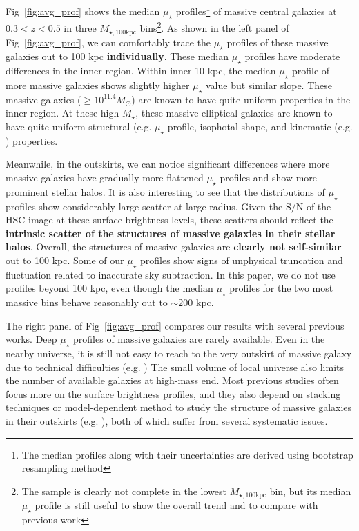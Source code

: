 \documentclass[a4paper,fleqn,usenatbib]{mnras}
\def\mstar{{$M_{\star}$}}
\def\mtot{{$M_{\star,100\mathrm{kpc}}$}}
\def\s2n{{$\mathrm{S}/\mathrm{N}$}}
\def\mden{{$\mu_{\star}$}}
\begin{document}
    Fig~\ref{fig:avg_prof} shows the median \mden{} profiles\footnote{The median 
    profiles along with their uncertainties are derived using bootstrap resampling 
    method} of massive central galaxies at $0.3 < z < 0.5$ in three \mtot{} 
    bins\footnote{The sample is clearly not complete in the lowest \mtot{} bin, 
    but its median \mden{} profile is still useful to show the overall trend and to 
    compare with previous work}. 
    As shown in the left panel of Fig~\ref{fig:avg_prof}, we can comfortably trace
    the \mden{} profiles of these massive galaxies out to 100 kpc 
    \textbf{individually}. 
    These median \mden{} profiles have moderate differences in the inner region. 
    Within inner 10 kpc, the median \mden{} profile of more massive galaxies 
    shows slightly higher \mden{} value but similar slope. 
    These massive galaxies ($\ge 10^{11.4} M_{\odot}$) are known to have quite 
    uniform properties in the inner region. 
    At these high \mstar{}, these massive elliptical galaxies are known to have 
    quite uniform structural (e.g. \mden{} profile, isophotal shape, 
    \citealt{Lauer07, Kormendy2009, Schombert2015} and kinematic (e.g. 
    \citealt{Cappellari13b}) properties. 
    
    Meanwhile, in the outskirts, we can notice significant differences where more 
    massive galaxies have gradually more flattened \mden{} profiles and show more 
    prominent stellar halos.
    It is also interesting to see that the distributions of \mden{} profiles show 
    considerably large scatter at large radius. 
    Given the \s2n{} of the HSC image at these surface brightness levels, these 
    scatters should reflect the \textbf{intrinsic scatter of the structures of 
    massive galaxies in their stellar halos}.
    Overall, the structures of massive galaxies are \textbf{clearly not 
    self-similar} out to 100 kpc. 
    Some of our \mden{} profiles show signs of unphysical truncation and fluctuation 
    related to inaccurate sky subtraction. 
    In this paper, we do not use profiles beyond 100 kpc, even though the median 
    \mden{} profiles for the two most massive bins behave reasonably out to 
    ${\sim} 200$ kpc. 
    
    The right panel of Fig~\ref{fig:avg_prof} compares our results with several 
    previous works. 
    Deep \mden{} profiles of massive galaxies are rarely available. 
    Even in the nearby universe, it is still not easy to reach to the very outskirt
    of massive galaxy due to technical difficulties (e.g. 
    \citealt{Capaccioli2015, Iodice2016, Iodice2017, Spavone2017, Mihos2017})
    The small volume of local universe also limits the number of available 
    galaxies at high-mass end.
    Most previous studies often focus more on the surface brightness profiles, 
    and they also depend on stacking techniques or model-dependent method to 
    study the structure of massive galaxies in their outskirts (e.g. 
    \citealt{Tal2011, DSouza2015}), both of which suffer from several systematic 
    issues. 
    
\end{document}

